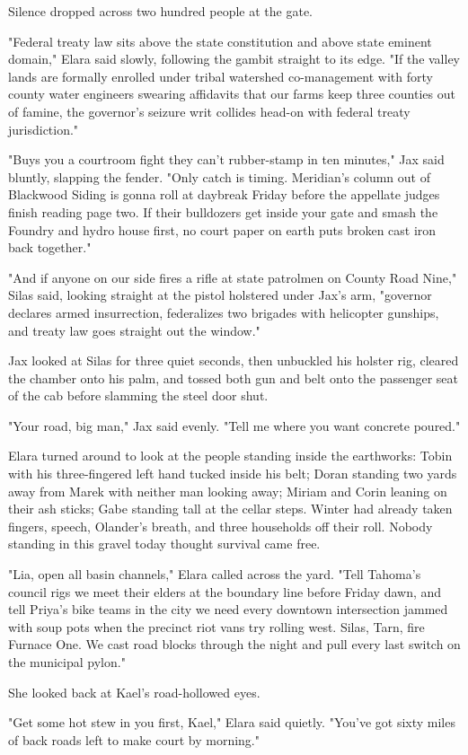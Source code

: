 Silence dropped across two hundred people at the gate.

"Federal treaty law sits above the state constitution and above state eminent domain," Elara said slowly, following the gambit straight to its edge. "If the valley lands are formally enrolled under tribal watershed co-management with forty county water engineers swearing affidavits that our farms keep three counties out of famine, the governor's seizure writ collides head-on with federal treaty jurisdiction."

"Buys you a courtroom fight they can't rubber-stamp in ten minutes," Jax said bluntly, slapping the fender. "Only catch is timing. Meridian's column out of Blackwood Siding is gonna roll at daybreak Friday before the appellate judges finish reading page two. If their bulldozers get inside your gate and smash the Foundry and hydro house first, no court paper on earth puts broken cast iron back together."

"And if anyone on our side fires a rifle at state patrolmen on County Road Nine," Silas said, looking straight at the pistol holstered under Jax's arm, "governor declares armed insurrection, federalizes two brigades with helicopter gunships, and treaty law goes straight out the window."

Jax looked at Silas for three quiet seconds, then unbuckled his holster rig, cleared the chamber onto his palm, and tossed both gun and belt onto the passenger seat of the cab before slamming the steel door shut.

"Your road, big man," Jax said evenly. "Tell me where you want concrete poured."

Elara turned around to look at the people standing inside the earthworks: Tobin with his three-fingered left hand tucked inside his belt; Doran standing two yards away from Marek with neither man looking away; Miriam and Corin leaning on their ash sticks; Gabe standing tall at the cellar steps. Winter had already taken fingers, speech, Olander's breath, and three households off their roll. Nobody standing in this gravel today thought survival came free.

"Lia, open all basin channels," Elara called across the yard. "Tell Tahoma's council rigs we meet their elders at the boundary line before Friday dawn, and tell Priya's bike teams in the city we need every downtown intersection jammed with soup pots when the precinct riot vans try rolling west. Silas, Tarn, fire Furnace One. We cast road blocks through the night and pull every last switch on the municipal pylon."

She looked back at Kael's road-hollowed eyes.

"Get some hot stew in you first, Kael," Elara said quietly. "You've got sixty miles of back roads left to make court by morning."
